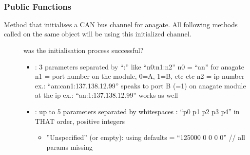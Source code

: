 \documentclass[letterpaper,10pt,english]{sphinxmanual}
\begin{document}
\begin{fulllineitems}
\label{\detokenize{vendors/anagate:_CPPv410AnaCanScan}}%
\pysigstartmultiline
{}\label{\detokenize{vendors/anagate:classAnaCanScan}}%
\pysigstopmultiline~\subsubsection*{Public Functions}

\begin{fulllineitems}
\label{\detokenize{vendors/anagate:_CPPv4N10AnaCanScan9createBusEK6stringK6string}}%
\pysigstartmultiline
{}\label{\detokenize{vendors/anagate:classAnaCanScan_1a54a66154c956b4605ff18f93f552db60}}%
\pysigstopmultiline
Method that initialises a CAN bus channel for anagate. All following methods called on the same object will be using this initialized channel.

\begin{description}
\item[{}] \leavevmode
was the initialisation process successful? 

\item[{}] \leavevmode\begin{itemize}
\item {} 
: 3 parameters separated by “:” like “n0:n1:n2” n0 = “an” for anagate n1 = port number on the module, 0=A, 1=B, etc etc n2 = ip number ex.: “an:can1:137.138.12.99” speaks to port B (=1) on anagate module at the ip ex.: “an:1:137.138.12.99” works as well

\item {} 
: up to 5 parameters separated by whitespaces : “p0 p1 p2 p3 p4” in THAT order, positive integers\begin{itemize}
\item {} 
”Unspecified” (or empty): using defaults = “125000 0 0 0 0” // all params missing


\end{itemize}
\end{itemize}
\end{description}
\end{fulllineitems}
\end{fulllineitems}
\end{document}
